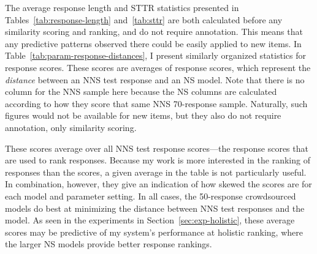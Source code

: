 The average response length and STTR statistics presented in Tables~\ref{tab:response-length} and~\ref{tab:sttr} are both calculated before any similarity scoring and ranking, and do not require annotation. This means that any predictive patterns observed there could be easily applied to new items. In Table~\ref{tab:param-response-distances}, I present similarly organized statistics for response scores. These scores are averages of response scores, which represent the \textit{distance} between an NNS test response and an NS model. Note that there is no column for the NNS sample here because the NS columns are calculated according to how they score that same NNS 70-response sample. Naturally, such figures would not be available for new items, but they also do not require annotation, only similarity scoring.

These scores average over all NNS test response scores---the response scores that are used to rank responses. Because my work is more interested in the ranking of responses than the scores, a given average in the table is not particularly useful. In combination, however, they give an indication of how skewed the scores are for each model and parameter setting. In all cases, the 50-response crowdsourced models do best at minimizing the distance between NNS test responses and the model. As seen in the experiments in Section~\ref{sec:exp-holistic}, these average scores may be predictive of my system's performance at holistic ranking, where the larger NS models provide better response rankings.


